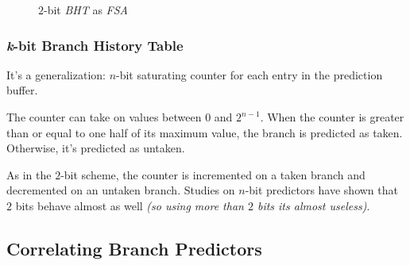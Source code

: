 \documentclass[english]{article}
\begin{document}
\begin{figure}[htbp]
  \bigskip
  \centering


  \caption{\(2\)-bit \textit{BHT} as \textit{FSA}}
  \label{fig:2-bit-BHT-as-FSA}
  \bigskip
\end{figure}

\subsubsection{\textit{k}-bit Branch History Table}

It's a generalization: \(n\)-bit saturating counter for each entry in the prediction buffer.

The counter can take on values between \(0\) and \(2^{n-1}\).
When the counter is greater than or equal to one half of its maximum value, the branch is predicted as taken.
Otherwise, it's predicted as untaken.

As in the \(2\)-bit scheme, the counter is incremented on a taken branch and decremented on an untaken branch.
Studies on \(n\)-bit predictors have shown that \(2\) bits behave almost as well \textit{(so using more than \(2\) bits its almost useless)}.

\subsection{Correlating Branch Predictors}
\end{document}
